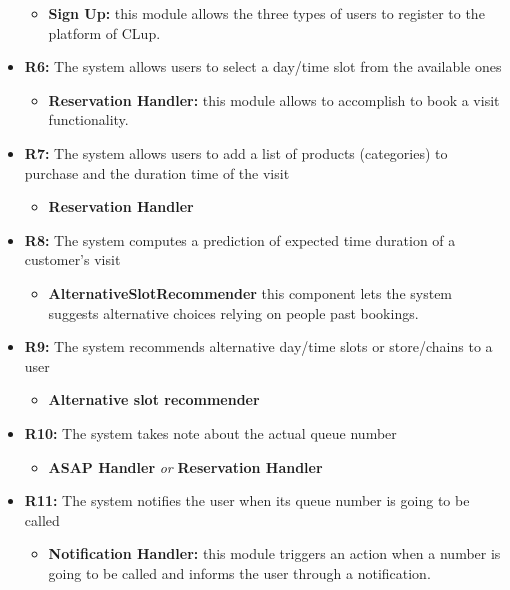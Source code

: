 \documentclass[table, 12pt]{article}
\begin{document}
\begin{itemize}
          \begin{itemize}
              \item \textbf{Sign Up:} this module allows the three types of users to register to the platform of CLup.
          \end{itemize}
    \item \textbf{R6:} The system allows users to select a day/time slot from the available ones
          \begin{itemize}
              \item \textbf{Reservation Handler:} this module allows to accomplish to book a visit functionality.
          \end{itemize}
    \item \textbf{R7:} The system allows users to add a list of products (categories) to purchase and the duration time of the visit
          \begin{itemize}
              \item \textbf{Reservation Handler}
          \end{itemize}
    \item \textbf{R8:} The system computes a prediction of expected time duration of a customer's visit
          \begin{itemize}
              \item \textbf{AlternativeSlotRecommender} this component lets the system suggests alternative choices relying on people past bookings.
          \end{itemize}
    \item \textbf{R9:} The system recommends alternative day/time slots or store/chains to a user
          \begin{itemize}
              \item \textbf{Alternative slot recommender}
          \end{itemize}
    \item \textbf{R10:} The system takes note about the actual queue number
          \begin{itemize}
              \item \textbf{ASAP Handler} \textit{or} \textbf{Reservation Handler}
          \end{itemize}
    \item \textbf{R11:} The system notifies the user when its queue number is going to be called
          \begin{itemize}
              \item \textbf{Notification Handler:} this module triggers an action when a number is going to be called and informs the user through a notification.
          \end{itemize}
\end{itemize}
\end{document}
